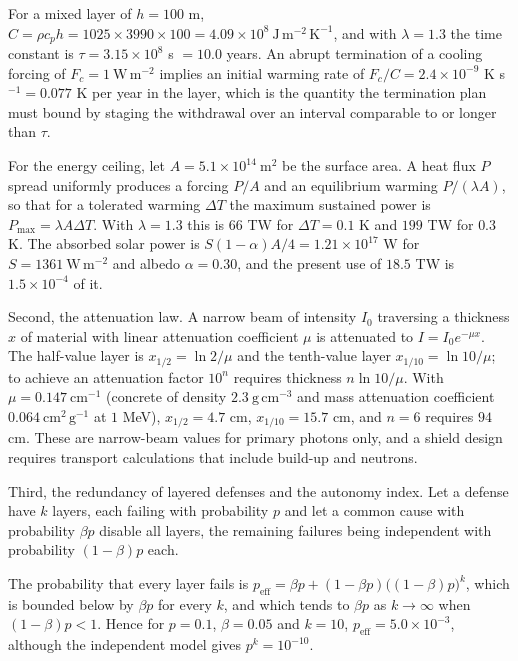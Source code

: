 For a mixed layer of $h=100$ m, $C=\rho c_ph=1025\times3990\times100=4.09\times10^8\ \mathrm{J\,m^{-2}\,K^{-1}}$, and with $\lambda=1.3$ the time constant is $\tau=3.15\times10^8$ s $=10.0$ years. An abrupt termination of a cooling forcing of $F_c=1\ \mathrm{W\,m^{-2}}$ implies an initial warming rate of $F_c/C=2.4\times10^{-9}$ K s$^{-1}=0.077$ K per year in the layer, which is the quantity the termination plan must bound by staging the withdrawal over an interval comparable to or longer than $\tau$.

For the energy ceiling, let $A=5.1\times10^{14}\ \mathrm{m^2}$ be the surface area. A heat flux $P$ spread uniformly produces a forcing $P/A$ and an equilibrium warming $P/(\lambda A)$, so that for a tolerated warming $\Delta T$ the maximum sustained power is $P_{\max}=\lambda A\Delta T$. With $\lambda=1.3$ this is $66$ TW for $\Delta T=0.1$ K and $199$ TW for $0.3$ K. The absorbed solar power is $S(1-\alpha)A/4=1.21\times10^{17}$ W for $S=1361\ \mathrm{W\,m^{-2}}$ and albedo $\alpha=0.30$, and the present use of $18.5$ TW is $1.5\times10^{-4}$ of it.

Second, the attenuation law. A narrow beam of intensity $I_0$ traversing a thickness $x$ of material with linear attenuation coefficient $\mu$ is attenuated to $I=I_0e^{-\mu x}$. The half-value layer is $x_{1/2}=\ln2/\mu$ and the tenth-value layer $x_{1/10}=\ln10/\mu$; to achieve an attenuation factor $10^n$ requires thickness $n\ln10/\mu$. With $\mu=0.147\ \mathrm{cm^{-1}}$ (concrete of density $2.3\ \mathrm{g\,cm^{-3}}$ and mass attenuation coefficient $0.064\ \mathrm{cm^2\,g^{-1}}$ at $1$ MeV), $x_{1/2}=4.7$ cm, $x_{1/10}=15.7$ cm, and $n=6$ requires $94$ cm. These are narrow-beam values for primary photons only, and a shield design requires transport calculations that include build-up and neutrons.

Third, the redundancy of layered defenses and the autonomy index. Let a defense have $k$ layers, each failing with probability $p$ and let a common cause with probability $\beta p$ disable all layers, the remaining failures being independent with probability $(1-\beta)p$ each.

\begin{proposition}
The probability that every layer fails is $p_{\mathrm{eff}}=\beta p+(1-\beta p)\big((1-\beta)p\big)^k$, which is bounded below by $\beta p$ for every $k$, and which tends to $\beta p$ as $k\to\infty$ when $(1-\beta)p<1$. Hence for $p=0.1$, $\beta=0.05$ and $k=10$, $p_{\mathrm{eff}}=5.0\times10^{-3}$, although the independent model gives $p^k=10^{-10}$.
\end{proposition}

